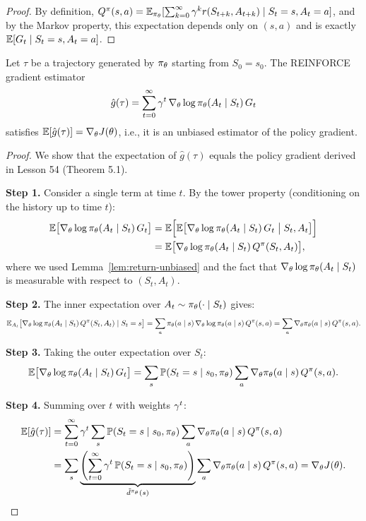 \documentclass[11pt,a4paper]{article}
\begin{document}
\begin{proof}
By definition, $Q^{\pi}(s,a) = \mathbb{E}_{\pi_\theta}[\sum_{k=0}^{\infty}
\gamma^k r(S_{t+k}, A_{t+k}) \mid S_t = s, A_t = a]$, and by the
Markov property, this expectation depends only on $(s,a)$ and is exactly
$\mathbb{E}[G_t \mid S_t = s, A_t = a]$.
\end{proof}

\begin{theorem}
\label{thm:reinforce-unbiased}
Let $\tau$ be a trajectory generated by $\pi_\theta$ starting from
$S_0 = s_0$. The REINFORCE gradient estimator
\[
  \hat{g}(\tau) = \sum_{t=0}^{\infty} \gamma^t\,
  \nabla_\theta \log \pi_\theta(A_t \mid S_t)\, G_t
\]
satisfies $\mathbb{E}[\hat{g}(\tau)] = \nabla_\theta J(\theta)$, i.e., it is an
unbiased estimator of the policy gradient.
\end{theorem}

\begin{proof}
We show that the expectation of $\hat{g}(\tau)$ equals the policy
gradient derived in Lesson 54 (Theorem 5.1).

\textbf{Step 1.} Consider a single term at time $t$. By the tower
property (conditioning on the history up to time $t$):
\begin{align*}
  \mathbb{E}\bigl[\nabla_\theta \log \pi_\theta(A_t \mid S_t)\, G_t\bigr]
  &= \mathbb{E}\Bigl[\mathbb{E}\bigl[\nabla_\theta \log \pi_\theta(A_t \mid S_t)\,
     G_t \;\big|\; S_t, A_t\bigr]\Bigr] \\
  &= \mathbb{E}\bigl[\nabla_\theta \log \pi_\theta(A_t \mid S_t)\,
     Q^{\pi}(S_t, A_t)\bigr],
\end{align*}
where we used Lemma~\ref{lem:return-unbiased} and the fact that
$\nabla_\theta \log \pi_\theta(A_t \mid S_t)$ is measurable with
respect to $(S_t, A_t)$.

\textbf{Step 2.} The inner expectation over $A_t \sim
\pi_\theta(\cdot \mid S_t)$ gives:
\[
  \mathbb{E}_{A_t}\bigl[\nabla_\theta \log \pi_\theta(A_t \mid S_t)\,
  Q^{\pi}(S_t, A_t) \mid S_t = s\bigr]
  = \sum_a \pi_\theta(a \mid s)\, \nabla_\theta \log
    \pi_\theta(a \mid s)\, Q^{\pi}(s,a)
  = \sum_a \nabla_\theta \pi_\theta(a \mid s)\, Q^{\pi}(s,a).
\]

\textbf{Step 3.} Taking the outer expectation over $S_t$:
\[
  \mathbb{E}\bigl[\nabla_\theta \log \pi_\theta(A_t \mid S_t)\, G_t\bigr]
  = \sum_s \mathbb{P}(S_t = s \mid s_0, \pi_\theta)
    \sum_a \nabla_\theta \pi_\theta(a \mid s)\, Q^{\pi}(s,a).
\]

\textbf{Step 4.} Summing over $t$ with weights $\gamma^t$:
\begin{align*}
  \mathbb{E}[\hat{g}(\tau)]
  &= \sum_{t=0}^{\infty} \gamma^t \sum_s
     \mathbb{P}(S_t = s \mid s_0, \pi_\theta)
     \sum_a \nabla_\theta \pi_\theta(a \mid s)\, Q^{\pi}(s,a) \\
  &= \sum_s \underbrace{\left(\sum_{t=0}^{\infty} \gamma^t\,
     \mathbb{P}(S_t = s \mid s_0, \pi_\theta)\right)}_{
     \tilde{d}^{\pi_\theta}(s)}
     \sum_a \nabla_\theta \pi_\theta(a \mid s)\, Q^{\pi}(s,a)
  = \nabla_\theta J(\theta). \qedhere
\end{align*}
\end{proof}
\end{document}

